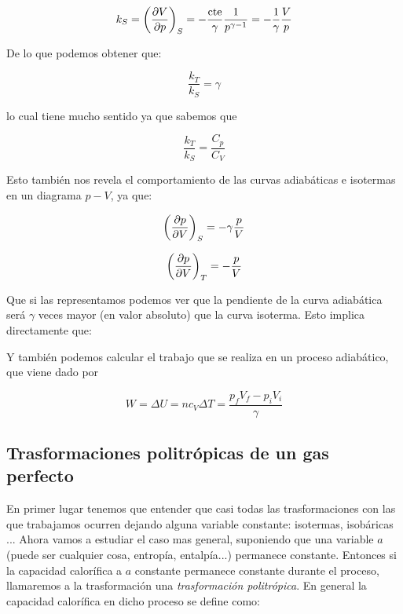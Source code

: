 \documentclass[12pt,a4paper]{article}
\begin{document}
\begin{equation}
k_S = \left( \frac{\partial V}{\partial p} \right)_S = - \dfrac{ \mathrm{cte}}{\gamma} \dfrac{1}{p^{\gamma-1}} = - \dfrac{1}{\gamma} \dfrac{V}{p}
\end{equation}

De lo que podemos obtener que:

\begin{equation}
\dfrac{k_T}{k_S} = \gamma
\end{equation}

lo cual tiene mucho sentido ya que sabemos que 

\begin{equation}
\dfrac{k_T}{k_S} = \dfrac{C_p}{C_V}
\end{equation}

Esto también nos revela el comportamiento de las curvas adiabáticas e isotermas en un diagrama $p-V$, ya que:

\begin{equation}
\left( \frac{\partial p}{\partial V} \right)_S = - \gamma \dfrac{p}{V}
\end{equation}

\begin{equation}
\left( \frac{\partial p}{\partial V} \right)_T = - \dfrac{p}{V}
\end{equation}

Que si las representamos podemos ver que la pendiente de la curva adiabática será $\gamma$ veces mayor (en valor absoluto) que la curva isoterma. Esto implica directamente que:



Y también podemos calcular el trabajo que se realiza en un proceso adiabático, que viene dado por

\begin{equation}
W = \Delta U = n c_V \Delta T = \dfrac{p_fV_f - p_i V_i}{\gamma}
\end{equation}


\subsection{Trasformaciones politrópicas de un gas perfecto}

En primer lugar tenemos que entender que casi todas las trasformaciones con las que trabajamos ocurren dejando alguna variable constante: isotermas, isobáricas ... Ahora vamos a estudiar el caso mas general, suponiendo que una variable $a$ (puede ser cualquier cosa, entropía, entalpía...) permanece constante. Entonces si la capacidad calorífica a $a$ constante permanece constante durante el proceso, llamaremos a la trasformación una \textit{trasformación politrópica}. En general la capacidad calorífica en dicho proceso se define como:
\end{document}
